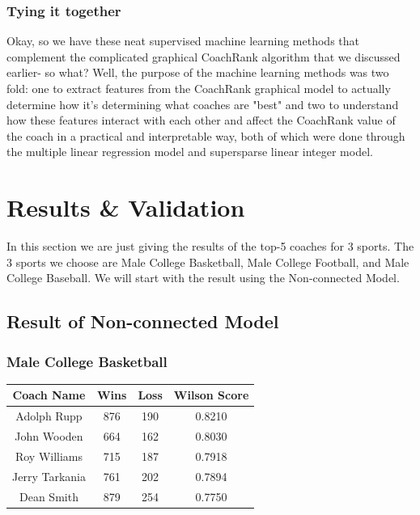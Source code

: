 \documentclass[titlepage,12pt]{article}
\begin{document}
\subsubsection*{Tying it together}

Okay, so we have these neat supervised machine learning methods that complement the complicated graphical CoachRank algorithm that we discussed earlier- so what? Well, the purpose of the machine learning methods was two fold: one to extract features from the CoachRank graphical model to actually determine how it's determining what coaches are "best" and two to understand how these features interact with each other and affect the CoachRank value of the coach in a practical and interpretable way, both of which were done through the multiple linear regression model and supersparse linear integer model.
\section{Results \& Validation}

In this section we are just giving the results of the top-5 coaches for 3 sports. The 3 sports we choose are Male College Basketball, Male College Football, and Male College Baseball. We will start with the result using the Non-connected Model.

\subsection{Result of Non-connected Model}

\subsubsection*{Male College Basketball}

\begin{center}
\begin{tabular}{ | c | c | c| c |}
\hline
Coach Name       & Wins  & Loss & Wilson Score \\\hline
Adolph Rupp      & 876   & 190  & 0.8210 \\\hline
John Wooden      & 664   & 162  & 0.8030 \\\hline
Roy Williams     & 715   & 187  & 0.7918 \\\hline
Jerry Tarkania   & 761   & 202  & 0.7894 \\\hline
Dean Smith       & 879   & 254  & 0.7750 \\
\hline
\end{tabular}
\end{center}
\end{document}

